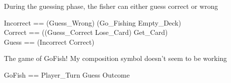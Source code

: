 \documentclass{article}
\begin{document}
During the guessing phase, the fisher can either guess correct or wrong
\begin{zed}
    Incorrect == (Guess\_Wrong) \land (Go\_Fishing \lor Empty\_Deck)\\
    Correct == ((Guess\_Correct \pipe Lose\_Card) \pipe Get\_Card) \\
    Guess == (Incorrect \lor Correct)
\end{zed}

The game of GoFish! My composition symbol doesn't seem to be working
\begin{zed}
    GoFish == Player\_Turn \semi Guess \semi Outcome\\
\end{zed}
    
\end{document}
